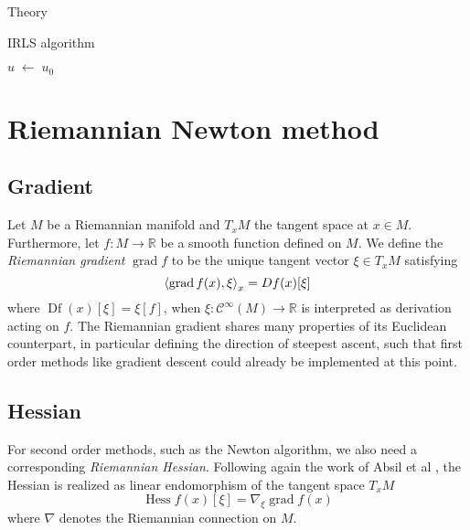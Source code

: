\begin{chapter}{Theory}
\begin{algorithm}
\caption{IRLS algorithm}
\label{eq:parallel_irls}
\begin{algorithmic}
    \STATE $u\; \leftarrow\;u_0$
\end{algorithmic}
\end{algorithm}

\section{Riemannian Newton method} %
\label{sec:Riemannian Newton method}

\subsection{Gradient} %
\label{sub:Gradient}
Let $M$ be a Riemannian manifold and $T_xM$ the tangent space at $x\in M$. Furthermore, let $f: M\to\mathbb{R}$ be a smooth function defined on $M$.
We define the \emph{Riemannian gradient} $\operatorname{grad} f$ to be the unique tangent vector $\xi\in T_xM$ satisfying 
\begin{equation}
    \label{eq:gradient}
    \left\langle \operatorname{grad}f(x),\xi \right\rangle_x=\mathop{Df}(x)[\xi]
\end{equation}
where $\mathop{Df}(x)[\xi] = \xi[f]$, when $\xi:\mathcal{C}^{\infty}(M)\to\mathbb{R}$ is interpreted as derivation acting on $f$. The Riemannian gradient
shares many properties of its Euclidean counterpart, in particular defining the direction of steepest ascent, such that first order methods like
gradient descent could already be implemented at this point.\\

\subsection{Hessian} %
\label{sub:Hessian}
For second order methods, such as the Newton algorithm, we also need a corresponding \emph{Riemannian Hessian}. Following again the work 
of Absil et al \cite{Absil2009}, the Hessian is realized as linear endomorphism of the tangent space $T_xM$
\begin{equation}
    \label{eq:hessian}
    \operatorname{Hess}f(x)[\xi]=\nabla_{\xi}\operatorname{grad}f(x)
\end{equation}
where $\nabla$ denotes the Riemannian connection on $M$.\\


\end{chapter}
